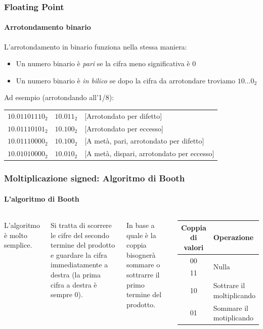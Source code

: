 \documentclass{beamer}
\begin{document}
  \begin{frame}
    \frametitle{Floating Point}
	  \framesubtitle{Arrotondamento binario}
		L'arrotondamento in binario funziona nella stessa maniera:
		\begin{itemize}
			\item Un numero binario è \emph{pari} se la cifra meno significativa è $0$
			\item Un numero binario è \emph{in bilico} se dopo la cifra da arrotondare troviamo
				$10\text{...}0_{2}$
		\end{itemize}
		\pause		
		\vspace{2em}
		Ad esempio (arrotondando all'1/8):
	    \begin{center}
	    		\begin{tabular}{ccl}
	    		$10.01101110_{2}$ & $10.011_{2}$ & [Arrotondato per difetto] \\ 
	    		$10.01110101_{2}$ & $10.100_{2}$ & [Arrotondato per eccesso] \\ 
	    		$10.01110000_{2}$ & $10.100_{2}$ & [A metà, pari, arrotondato per difetto] \\ 
	    		$10.01010000_{2}$ & $10.010_{2}$ & [A metà, dispari, arrotondato per eccesso] \\ 
	    		\end{tabular} 
	    \end{center}
  \end{frame}
  \begin{frame}
    \frametitle{Moltiplicazione signed: Algoritmo di Booth}
    \framesubtitle{L'algoritmo di Booth}
    \begin{columns}
    	  L'algoritmo è molto semplice.
    	  
    	  Si tratta di scorrere le cifre del secondo termine del
    	  prodotto e guardare la cifra immediatamente a destra
    	  (la prima cifra a destra è sempre 0).
    	  
			\vspace{2em}    	  
    	  
    	  In base a quale è la coppia bisognerà sommare o sottrarre
    	  il primo termine del prodotto.
    		\begin{center}
			\begin{tabular}{|c||p{6em}|}
				\hline				
				Coppia di valori & Operazione \\
				\hline
				00 & \multirow{2}{*}{Nulla} \\
				11 & \\
				\hline				
				10 & Sottrare il moltiplicando 	\\
				\hline				
				01 & Sommare il motiplicando 		\\
				\hline 
			\end{tabular}
			\end{center}
    \end{columns}
  \end{frame}
\end{document}
